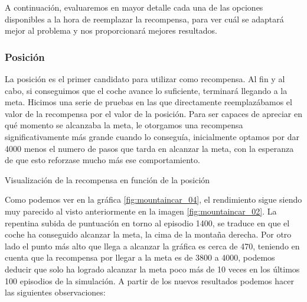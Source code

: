 A continuación, evaluaremos en mayor detalle cada una de las opciones disponibles a la hora de reemplazar la recompensa, para ver cuál se adaptará mejor al problema y nos proporcionará mejores resultados.


\subsubsection*{Posición}

La posición es el primer candidato para utilizar como recompensa. Al fin y al cabo, si conseguimos que el coche avance lo suficiente, terminará llegando a la meta. Hicimos una serie de pruebas en las que directamente reemplazábamos el valor de la recompensa por el valor de la posición. Para ser capaces de apreciar en qué momento se alcanzaba la meta, le otorgamos una recompensa significativamente más grande cuando lo conseguía, inicialmente optamos por dar 4000 menos el numero de pasos que tarda en alcanzar la meta, con la esperanza de que esto reforzase mucho más ese comportamiento.

%
       {Visualización de la recompensa en función de la posición}

Como podemos ver en la gráfica \ref{fig:mountaincar_04}, el rendimiento sigue siendo muy parecido al visto anteriormente en la imagen \ref{fig:mountaincar_02}. La repentina subida de puntuación en torno al episodio 1400, se traduce en que el coche ha conseguido alcanzar la meta, la cima de la montaña derecha. Por otro lado el punto más alto que llega a alcanzar la gráfica es cerca de 470, teniendo en cuenta que la recompensa por llegar a la meta es de 3800 a 4000, podemos deducir que solo ha logrado alcanzar la meta poco más de 10 veces en los últimos 100 episodios de la simulación. A partir de los nuevos resultados podemos hacer las siguientes observaciones:

